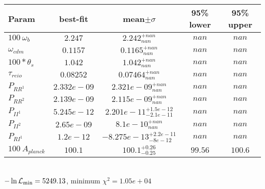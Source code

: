 \begin{tabular}{|l|c|c|c|c|} 
 \hline 
Param & best-fit & mean$\pm\sigma$ & 95\% lower & 95\% upper \\ \hline 
$100~\omega_{b }$ &$2.247$ & $2.242_{nan}^{+nan}$ & $nan$ & $nan$ \\ 
$\omega_{cdm }$ &$0.1157$ & $0.1165_{nan}^{+nan}$ & $nan$ & $nan$ \\ 
$100*\theta_{s }$ &$1.042$ & $1.042_{nan}^{+nan}$ & $nan$ & $nan$ \\ 
$\tau_{reio }$ &$0.08252$ & $0.07464_{nan}^{+nan}$ & $nan$ & $nan$ \\ 
$P_{{RR}^1 }$ &$2.332e-09$ & $2.321e-09_{nan}^{+nan}$ & $nan$ & $nan$ \\ 
$P_{{RR}^2 }$ &$2.139e-09$ & $2.115e-09_{nan}^{+nan}$ & $nan$ & $nan$ \\ 
$P_{{II}^1 }$ &$5.245e-12$ & $2.201e-11_{-2.1e-11}^{+1.5e-12}$ & $nan$ & $nan$ \\ 
$P_{{II}^2 }$ &$2.65e-09$ & $8.1e-10_{nan}^{+nan}$ & $nan$ & $nan$ \\ 
$P_{{RI}^1 }$ &$1.2e-12$ & $-8.275e-13_{-8e-12}^{+2.2e-11}$ & $nan$ & $nan$ \\ 
$100~A_{planck }$ &$100.1$ & $100.1_{-0.25}^{+0.26}$ & $99.56$ & $100.6$ \\ 
\hline 
 \end{tabular} \\ 
$-\ln{\cal L}_\mathrm{min} =5249.13$, minimum $\chi^2=1.05e+04$ \\ 
